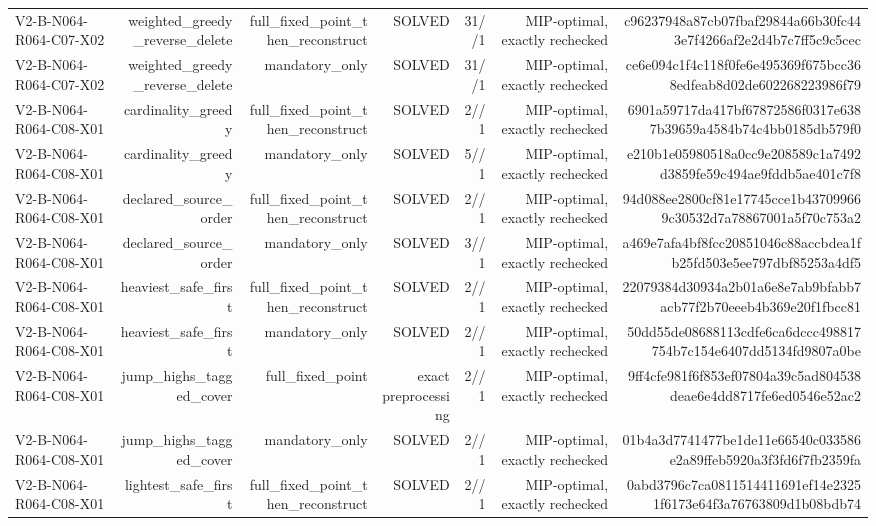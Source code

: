 {\begin{longtable}{lrrrrrr}
V2-B-N064-R064-C07-X02 & weighted\_greedy\_reverse\_delete & full\_fixed\_point\_then\_reconstruct & SOLVED & 31//1 & MIP-optimal, exactly rechecked & c96237948a87cb07fbaf29844a66b30fc443e7f4266af2e2d4b7c7ff5c9c5cec \\
V2-B-N064-R064-C07-X02 & weighted\_greedy\_reverse\_delete & mandatory\_only & SOLVED & 31//1 & MIP-optimal, exactly rechecked & ce6e094c1f4c118f0fe6e495369f675bcc368edfeab8d02de602268223986f79 \\
V2-B-N064-R064-C08-X01 & cardinality\_greedy & full\_fixed\_point\_then\_reconstruct & SOLVED & 2//1 & MIP-optimal, exactly rechecked & 6901a59717da417bf67872586f0317e6387b39659a4584b74c4bb0185db579f0 \\
V2-B-N064-R064-C08-X01 & cardinality\_greedy & mandatory\_only & SOLVED & 5//1 & MIP-optimal, exactly rechecked & e210b1e05980518a0cc9e208589c1a7492d3859fe59c494ae9fddb5ae401c7f8 \\
V2-B-N064-R064-C08-X01 & declared\_source\_order & full\_fixed\_point\_then\_reconstruct & SOLVED & 2//1 & MIP-optimal, exactly rechecked & 94d088ee2800cf81e17745cce1b437099669c30532d7a78867001a5f70c753a2 \\
V2-B-N064-R064-C08-X01 & declared\_source\_order & mandatory\_only & SOLVED & 3//1 & MIP-optimal, exactly rechecked & a469e7afa4bf8fcc20851046c88accbdea1fb25fd503e5ee797dbf85253a4df5 \\
V2-B-N064-R064-C08-X01 & heaviest\_safe\_first & full\_fixed\_point\_then\_reconstruct & SOLVED & 2//1 & MIP-optimal, exactly rechecked & 22079384d30934a2b01a6e8e7ab9bfabb7acb77f2b70eeeb4b369e20f1fbcc81 \\
V2-B-N064-R064-C08-X01 & heaviest\_safe\_first & mandatory\_only & SOLVED & 2//1 & MIP-optimal, exactly rechecked & 50dd55de08688113cdfe6ca6dccc498817754b7c154e6407dd5134fd9807a0be \\
V2-B-N064-R064-C08-X01 & jump\_highs\_tagged\_cover & full\_fixed\_point & exact preprocessing & 2//1 & MIP-optimal, exactly rechecked & 9ff4cfe981f6f853ef07804a39c5ad804538deae6e4dd8717fe6ed0546e52ac2 \\
V2-B-N064-R064-C08-X01 & jump\_highs\_tagged\_cover & mandatory\_only & SOLVED & 2//1 & MIP-optimal, exactly rechecked & 01b4a3d7741477be1de11e66540c033586e2a89ffeb5920a3f3fd6f7fb2359fa \\
V2-B-N064-R064-C08-X01 & lightest\_safe\_first & full\_fixed\_point\_then\_reconstruct & SOLVED & 2//1 & MIP-optimal, exactly rechecked & 0abd3796c7ca0811514411691ef14e23251f6173e64f3a76763809d1b08bdb74 \\

\end{longtable}}
